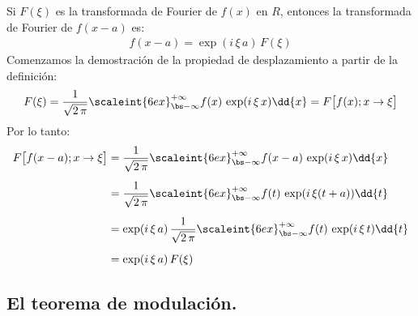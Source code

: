 Si $F(\xi)$ es la transformada de Fourier de $f(x)$ en $R$, entonces la transformada de Fourier de $f(x - a)$ es:
\begin{align*}
f(x - a) = \exp(i \, \xi \, a) \, F(\xi)
\end{align*}
Comenzamos la demostración de la propiedad de desplazamiento a partir de la definición:
\begin{align*}
F(\xi) = \dfrac{1}{\sqrt{2 \, \pi}} \scaleint{6ex}_{\bs -\infty}^{+\infty} f(x) \, \exp(i \, \xi \, x) \dd{x} = F \big[ f(x); x \to \xi \big]
\end{align*}
Por lo tanto:
\begin{align*}
F \big[ f(x - a); x \to \xi \big] &= \dfrac{1}{\sqrt{2 \, \pi}} \scaleint{6ex}_{\bs -\infty}^{+\infty} f(x - a) \, \exp(i \, \xi \, x) \dd{x} \\[0.5em]
&= \dfrac{1}{\sqrt{2 \, \pi}} \scaleint{6ex}_{\bs -\infty}^{+\infty} f(t) \, \exp(i \, \xi (t + a)) \dd{t} \\[0.5em]
&= \exp(i \, \xi \, a) \, \dfrac{1}{\sqrt{2 \, \pi}} \scaleint{6ex}_{\bs -\infty}^{+\infty} f(t) \, \exp(i \, \xi \, t) \dd{t} \\[0.5em]
&= \exp(i \, \xi \, a) \, F (\xi) 
\end{align*}

\subsection{El teorema de modulación.}

